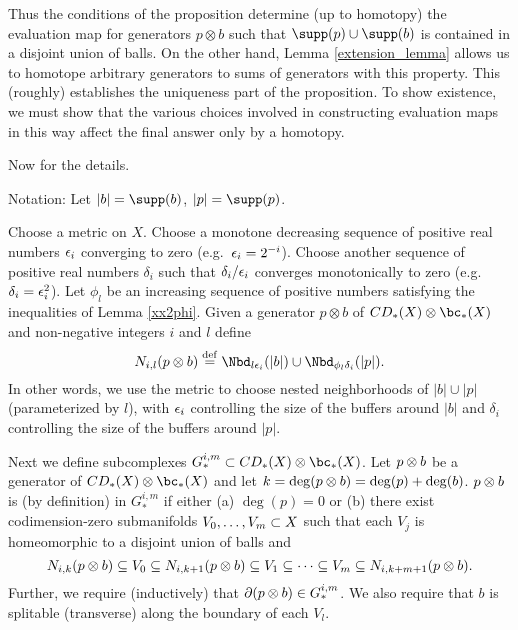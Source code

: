 Thus the conditions of the proposition determine (up to homotopy) the evaluation
map for generators $p\otimes b$ such that $\supp(p) \cup \supp(b)$ is contained in a disjoint
union of balls.
On the other hand, Lemma \ref{extension_lemma} allows us to homotope 
 arbitrary generators to sums of generators with this property.
This (roughly) establishes the uniqueness part of the proposition.
To show existence, we must show that the various choices involved in constructing
evaluation maps in this way affect the final answer only by a homotopy.



\medskip

Now for the details.

Notation: Let $|b| = \supp(b)$, $|p| = \supp(p)$.

Choose a metric on $X$.
Choose a monotone decreasing sequence of positive real numbers $\epsilon_i$ converging to zero
(e.g.\ $\epsilon_i = 2^{-i}$).
Choose another sequence of positive real numbers $\delta_i$ such that $\delta_i/\epsilon_i$
converges monotonically to zero (e.g.\ $\delta_i = \epsilon_i^2$).
Let $\phi_l$ be an increasing sequence of positive numbers
satisfying the inequalities of Lemma \ref{xx2phi}.
Given a generator $p\otimes b$ of $CD_*(X)\otimes \bc_*(X)$ and non-negative integers $i$ and $l$
define
\[
	N_{i,l}(p\ot b) \deq \Nbd_{l\ep_i}(|b|) \cup \Nbd_{\phi_l\delta_i}(|p|).
\]
In other words, we use the metric to choose nested neighborhoods of $|b|\cup |p|$ (parameterized
by $l$), with $\epsilon_i$ controlling the size of the buffers around $|b|$ and $\delta_i$ controlling
the size of the buffers around $|p|$.

Next we define subcomplexes $G_*^{i,m} \sub CD_*(X)\otimes \bc_*(X)$.
Let $p\otimes b$ be a generator of $CD_*(X)\otimes \bc_*(X)$ and let $k = \deg(p\otimes b)
= \deg(p) + \deg(b)$.
$p\otimes b$ is (by definition) in $G_*^{i,m}$ if either (a) $\deg(p) = 0$ or (b)
there exist codimension-zero submanifolds $V_0,\ldots,V_m \subset X$ such that each $V_j$
is homeomorphic to a disjoint union of balls and
\[
	N_{i,k}(p\otimes b) \subseteq V_0 \subseteq N_{i,k+1}(p\otimes b)
			\subseteq V_1 \subseteq \cdots \subseteq V_m \subseteq N_{i,k+m+1}(p\otimes b) .
\]
Further, we require (inductively) that $\partial(p\otimes b) \in G_*^{i,m}$.
We also require that $b$ is splitable (transverse) along the boundary of each $V_l$.


